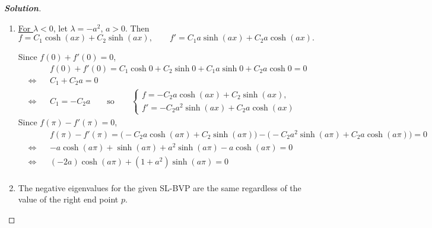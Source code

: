 \documentclass[a4paper,12pt]{article} %
\theoremstyle{plain}
\begin{document}
\begin{proof}[\textbf{Solution}] %
    \begin{enumerate}[label=\alph*.)]
        \item  \underline{For $\lambda < 0$}, let $\lambda = -a^2$, $a>0$. Then \begin{equation*}
        f = C_1 \cosh (a x) + C_2 \sinh (ax), \qquad f' =  C_1 a\sinh (a x) + C_2 a\cosh (ax).
        \end{equation*}
        
        Since $f(0) + f'(0) = 0$,
        \begin{align*}
            &&&f(0) + f'(0) = C_1 \cosh 0 + C_2 \sinh 0 + C_1 a \sinh 0 + C_2 a \cosh 0 = 0\\
            &\iff& &C_1 + C_2 a = 0 \\
            &\iff& &C_1 = -C_2 a  \qquad \text{so}\qquad \begin{cases}
                f=-C_2 a \cosh (ax) + C_2 \sinh(ax),\\
                f'=-C_2 a^2 \sinh(ax) + C_2 a \cosh(ax)
            \end{cases}
        \end{align*}
        Since $f(\pi) -f'(\pi) = 0$,
        \begin{align*}
            && &f(\pi) - f'(\pi) = \Big(-C_2a \cosh (a\pi) + C_2 \sinh (a\pi)\Big) - \Big(-  C_2a^2\sinh (a \pi) + C_2 a\cosh (a\pi)\Big) =0 \\
            &\iff&& -a \cosh(a\pi) + \sinh(a\pi) + a^2 \sinh(a\pi) - a \cosh(a\pi) = 0\\
            &\iff&& (-2a)\cosh(a\pi) + (1+a^2)\sinh(a\pi) = 0\\
        \end{align*}
    
    \item The negative eigenvalues for the given SL-BVP are the same regardless of the value of the right end point $p$.
    \end{enumerate}
\end{proof}
\end{document}
